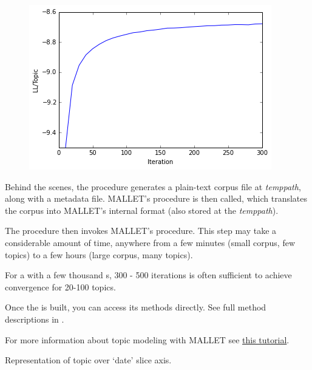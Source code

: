 \documentclass[letterpaper,10pt,english]{sphinxmanual}
\begin{document}
\begin{fulllineitems}
\begin{figure}[htbp]
\includegraphics{ldamodel_LL.png}
\end{figure}

Behind the scenes, the  procedure generates a plain-text corpus
file at \emph{temppath}, along with a metadata file. MALLET's 
procedure is then called, which translates the corpus into MALLET's internal
format (also stored at the \emph{temppath}).

The  procedure then invokes MALLET's 
procedure. This step may take a considerable amount of time, anywhere from 
a few minutes (small corpus, few topics) to a few hours (large corpus, many
topics).

For a {\hyperref[tethne.classes.corpus:tethne.classes.corpus.Corpus]{}} with a few thousand {\hyperref[tethne.classes.paper:tethne.classes.paper.Paper]{}}s, 300 - 500 
iterations is often sufficient to achieve convergence for 20-100 topics.

Once the {\hyperref[tethne.model.corpus.ldamodel:tethne.model.corpus.ldamodel.LDAModel]{}} is built, you can access its methods directly.
See full method descriptions in {\hyperref[tethne.model.corpus.ldamodel:tethne.model.corpus.ldamodel.LDAModel]{}}.

For more information about topic modeling with MALLET see 
\href{http://programminghistorian.org/lessons/topic-modeling-and-mallet}{this tutorial}.

\begin{fulllineitems}
\label{tethne.model.managers.mallet:tethne.model.managers.mallet.MALLETModelManager.topic_over_time}
Representation of topic  over `date' slice axis.


\end{fulllineitems}
\end{fulllineitems}
\end{document}
